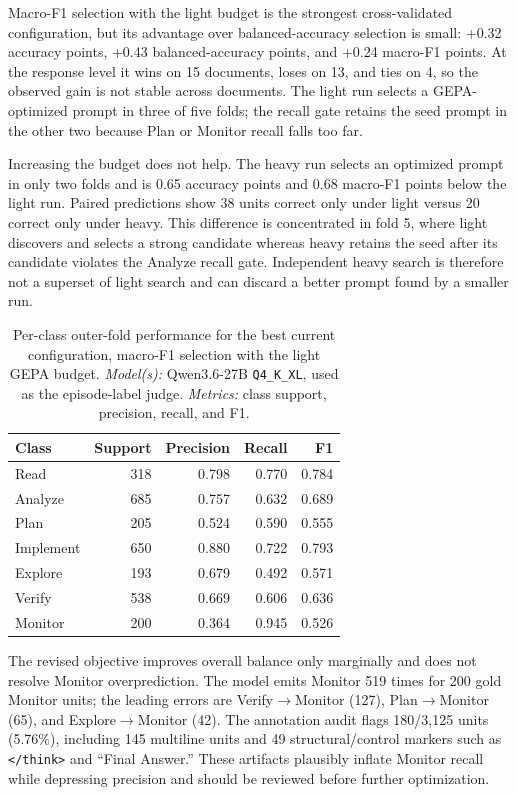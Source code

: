 \documentclass[manuscript,screen,review]{jair}
\newcommand{\modelmetrics}[2]{\textit{Model(s):} #1. \textit{Metrics:} #2.}
\begin{document}
Macro-F1 selection with the light budget is the strongest cross-validated
configuration, but its advantage over balanced-accuracy selection is small:
+0.32 accuracy points, +0.43 balanced-accuracy points, and +0.24 macro-F1
points.  At the response level it wins on 15 documents, loses on 13, and ties
on 4, so the observed gain is not stable across documents.  The light run
selects a GEPA-optimized prompt in three of five folds; the recall gate retains
the seed prompt in the other two because Plan or Monitor recall falls too far.

Increasing the budget does not help.  The heavy run selects an optimized
prompt in only two folds and is 0.65 accuracy points and 0.68 macro-F1 points
below the light run.  Paired predictions show 38 units correct only under
light versus 20 correct only under heavy.  This difference is concentrated in
fold 5, where light discovers and selects a strong candidate whereas heavy
retains the seed after its candidate violates the Analyze recall gate.
Independent heavy search is therefore not a superset of light search and can
discard a better prompt found by a smaller run.

\begin{table}[t]
\centering
\caption{Per-class outer-fold performance for the best current configuration,
macro-F1 selection with the light GEPA budget.  \modelmetrics{Qwen3.6-27B
\texttt{Q4\_K\_XL}, used as the episode-label judge}{class support, precision,
recall, and F1}}
\label{tab:exp0a-classes}
\begin{tabular}{lrrrr}
\toprule
Class & Support & Precision & Recall & F1 \\
\midrule
Read      & 318 & 0.798 & 0.770 & 0.784 \\
Analyze   & 685 & 0.757 & 0.632 & 0.689 \\
Plan      & 205 & 0.524 & 0.590 & 0.555 \\
Implement & 650 & 0.880 & 0.722 & 0.793 \\
Explore   & 193 & 0.679 & 0.492 & 0.571 \\
Verify    & 538 & 0.669 & 0.606 & 0.636 \\
Monitor   & 200 & 0.364 & 0.945 & 0.526 \\
\bottomrule
\end{tabular}
\end{table}

The revised objective improves overall balance only marginally and does not
resolve Monitor overprediction.  The model emits Monitor 519 times for 200
gold Monitor units; the leading errors are Verify$\rightarrow$Monitor (127),
Plan$\rightarrow$Monitor (65), and Explore$\rightarrow$Monitor (42).  The
annotation audit flags 180/3,125 units (5.76\%), including 145 multiline units
and 49 structural/control markers such as \texttt{</think>} and ``Final
Answer.''  These artifacts plausibly inflate Monitor recall while depressing
precision and should be reviewed before further optimization.
\end{document}
